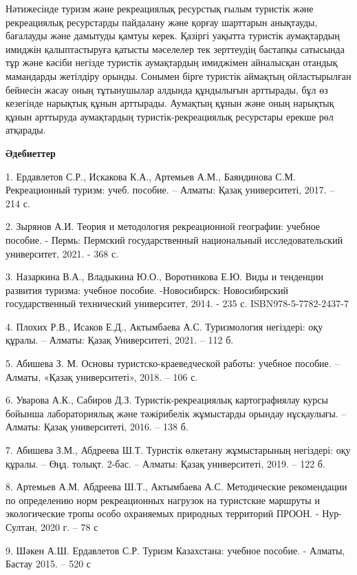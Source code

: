 \begin{multicols}{2}
Нәтижесінде туризм және рекреациялық ресурстық ғылым туристік және
рекреациялық ресурстарды пайдалану және қорғау шарттарын анықтауды,
бағалауды және дамытуды қамтуы керек. Қазіргі уақытта туристік
аумақтардың имиджін қалыптастыруға қатысты мәселелер тек зерттеудің
бастапқы сатысында тұр және кәсіби негізде туристік аумақтардың
имиджімен айналысқан отандық мамандарды жетілдіру орынды. Сонымен бірге
туристік аймақтың ойластырылған бейнесін жасау оның тұтынушылар алдында
құндылығын арттырады, бұл өз кезегінде нарықтық құнын арттырады.
Аумақтың құнын және оның нарықтық құнын арттыруда аумақтардың
туристік-рекреациялық ресурстары ерекше рөл атқарады.
\end{multicols}

\begin{center}
{\bfseries Әдебиеттер}
\end{center}

\begin{noparindent}
1. Ердавлетов С.Р., Искакова К.А., Артемьев А.М., Баяндинова С.М.
Рекреационный туризм: учеб. пособие. -- Алматы: Қазақ университеті,
2017. -- 214 с.

2. Зырянов А.И. Теория и методология рекреационной географии: учебное
пособие. - Пермь: Пермский государственный национальный
исследовательский университет, 2021. - 368 с.

3. Назаркина В.А., Владыкина Ю.О., Воротникова Е.Ю. Виды и тенденции
развития туризма: учебное пособие. -Новосибирск: Новосибирский
государственный технический университет, 2014. - 235 с.
ISBN978-5-7782-2437-7

4. Плохих Р.В., Исаков Е.Д., Актымбаева А.С. Туризмология негіздері: оқу
құралы. -- Алматы: Қазақ Университеті, 2021. -- 112 б.

5. Абишева З. М. Основы туристско-краеведческой работы: учебное пособие.
-- Алматы, «Қазақ университеті», 2018. -- 106 с.

6. Уварова А.К., Сабиров Д.З. Туристік-рекреациялық картографиялау курсы
бойынша лабораториялық және тәжірибелік жұмыстарды орындау нұсқаулығы.
-- Алматы: Қазақ университеті, 2016. -- 138 б.

7. Абишева З.М., Абдреева Ш.Т. Туристік өлкетану жұмыстарының негіздері:
оқу құралы. -- Өңд. толықт. 2-бас. -- Алматы: Қазақ университеті, 2019.
-- 122 б.

8. Артемьев А.М. Абдреева Ш.Т., Актымбаева А.С. Методические
рекомендации по определению норм рекреационных нагрузок на туристские
маршруты и экологические тропы особо охраняемых природных территорий
ПРООН. - Нур-Султан, 2020 г. -- 78 с

9. Шәкен А.Ш. Ердавлетов С.Р. Туризм Казахстана: учебное пособие. -
Алматы, Бастау 2015. -- 520 с
\end{noparindent}

